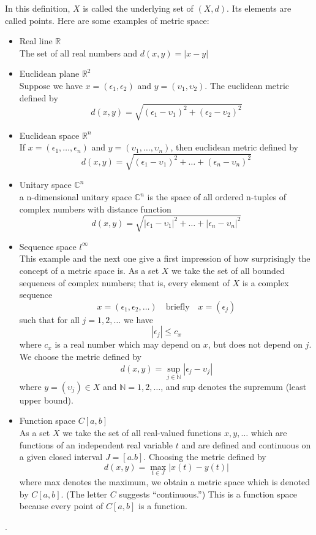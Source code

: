 \documentclass[9pt]{article}
\begin{document}
In this definition, $X$ is called the underlying set of $(X,d)$. Its elements are called points. Here are some examples of metric space:
\begin{itemize}
\item Real line $\mathbb{R}$\\
The set of all real numbers and $d(x,y) = |x-y|$
\item Euclidean plane $\mathbb{R}^2$\\
Suppose we have $x = (\epsilon_1,\epsilon_2)$ and $y = (\upsilon_1,\upsilon_2)$. The euclidean metric defined by 
\[
d(x,y) = \sqrt{(\epsilon_1-\upsilon_1)^2+(\epsilon_2-\upsilon_2)^2}
\]
\item Euclidean space $\mathbb{R}^n$\\
If $x = (\epsilon_1,\ldots,\epsilon_n)$ and $y = (\upsilon_1,\ldots,\upsilon_n)$, then euclidean metric defined by 
\[
d(x,y) = \sqrt{(\epsilon_1-\upsilon_1)^2+\ldots+(\epsilon_n-\upsilon_n)^2}
\]
\item Unitary space $\mathbb{C}^n$\\
a n-dimensional unitary space $\mathbb{C}^n$ is the space of all ordered n-tuples of complex numbers with distance function
\[
d(x,y) = \sqrt{|\epsilon_1-\upsilon_1|^2+\ldots+|\epsilon_n-\upsilon_n|^2}
\]
\item Sequence space $l^{\infty}$\\
 This example and the next one give a first impression of how surprisingly the concept of a metric space is. As a set $X$ we take the set of all bounded sequences of complex numbers; that is, every element of $X$ is a complex sequence
 \[
 x = (\epsilon_1,\epsilon_2,\ldots) \quad \text{briefly} \quad  x = (\epsilon_j)
 \]
 such that for all $j=1,2,\ldots$ we have 
\[
|\epsilon_j|\le c_x
\]
where $c_x$ is a real number which may depend on $x$, but does not depend on $j$. We choose the metric defined by
\[
d(x,y) = \sup_{j \in \mathbb{N}}|\epsilon_j-\upsilon_j|
\]
where $y = (\upsilon_j) \in X$ and $\mathbb{N} = {1,2,\ldots}$, and sup denotes the supremum (least upper bound).
 \item Function space $C[a,b]$\\
 As a set $X$ we take the set of all real-valued functions $x,y,\ldots$ which are functions of an independent real variable $t$ and are defined and continuous on a given closed interval $J = [a.b]$. Choosing the metric defined by 
 \[
 d(x,y) = \max_{t\in J}|x(t)-y(t)|
 \]
 where max denotes the maximum, we obtain a metric space which is denoted by $C[a,b]$. (The letter $C$ suggests ``continuous.'') This is a function space because every point of $C[a,b]$ is a function.
\end{itemize}
\citep{Kreyszig1989Introductory}.
\end{document}
